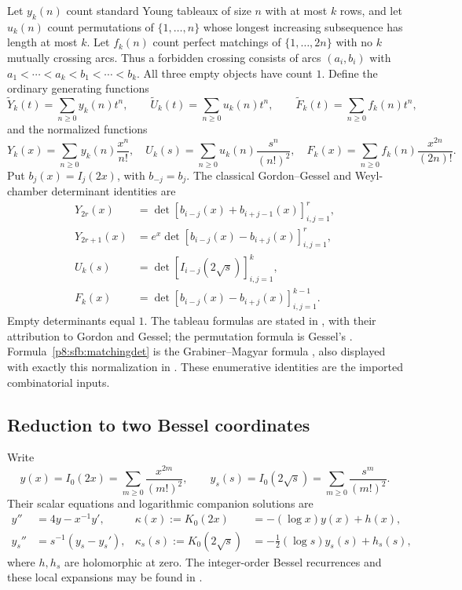 \documentclass[11pt,a4paper]{article}
\theoremstyle{definition}
\theoremstyle{remark}
\numberwithin{equation}{section}
\begin{document}
Let $y_k(n)$ count standard Young tableaux of size $n$ with at most
$k$ rows, and let $u_k(n)$ count permutations of $\{1,\ldots,n\}$
whose longest increasing subsequence has length at most $k$.
Let $f_k(n)$ count perfect matchings of $\{1,\ldots,2n\}$ with
no $k$ mutually crossing arcs.  Thus a forbidden crossing consists
of arcs $(a_i,b_i)$ with
$a_1<\cdots<a_k<b_1<\cdots<b_k$.
All three empty objects have count $1$.
Define the ordinary generating functions
\[
 \widetilde Y_k(t)=\sum_{n\ge0}y_k(n)t^n,\qquad
 \widetilde U_k(t)=\sum_{n\ge0}u_k(n)t^n,\qquad
 \widetilde F_k(t)=\sum_{n\ge0}f_k(n)t^n,
\]
and the normalized functions
\[
 Y_k(x)=\sum_{n\ge0}y_k(n)\frac{x^n}{n!},\quad
 U_k(s)=\sum_{n\ge0}u_k(n)\frac{s^n}{(n!)^2},\quad
 F_k(x)=\sum_{n\ge0}f_k(n)\frac{x^{2n}}{(2n)!}.
\]
Put $b_j(x)=I_j(2x)$, with $b_{-j}=b_j$.  The classical
Gordon--Gessel and Weyl-chamber determinant identities are
\begin{align}
 Y_{2r}(x)&=\det[b_{i-j}(x)+b_{i+j-1}(x)]_{i,j=1}^{r},
       \label{p8:sfb:tableaueven}\\
 Y_{2r+1}(x)&=e^x\det[b_{i-j}(x)-b_{i+j}(x)]_{i,j=1}^{r},
       \label{p8:sfb:tableauodd}\\
 U_k(s)&=\det[I_{i-j}(2\sqrt{s})]_{i,j=1}^{k},
       \label{p8:sfb:permdet}\\
 F_k(x)&=\det[b_{i-j}(x)-b_{i+j}(x)]_{i,j=1}^{k-1}.
       \label{p8:sfb:matchingdet}
\end{align}
Empty determinants equal $1$.  The tableau formulas are stated
in \cite[\S1.2, equations (6)--(7)]{p8:SFB_Mishna}, with their
attribution to Gordon and Gessel; the permutation formula is
Gessel's \cite{p8:SFB_Gessel}.  Formula~\eqref{p8:sfb:matchingdet}
is the Grabiner--Magyar formula \cite{p8:SFB_GrabinerMagyar},
also displayed with exactly this normalization in
\cite[equation (1.4)]{p8:SFB_JinReidysWang}.
These enumerative identities are the imported combinatorial inputs.

\subsection{Reduction to two Bessel coordinates}

Write
\[
 y(x)=I_0(2x)=\sum_{m\ge0}\frac{x^{2m}}{(m!)^2},\qquad
 y_s(s)=I_0(2\sqrt{s})=\sum_{m\ge0}\frac{s^m}{(m!)^2}.
\]
Their scalar equations and logarithmic companion solutions are
\begin{align}
 y''&=4y-x^{-1}y',&
 \kappa(x):=K_0(2x)&=-(\log x)y(x)+h(x),\label{p8:sfb:besselx}\\
 y_s''&=s^{-1}(y_s-y_s'),&
 \kappa_s(s):=K_0(2\sqrt{s})
       &=-\tfrac12(\log s)y_s(s)+h_s(s),\label{p8:sfb:bessels}
\end{align}
where $h,h_s$ are holomorphic at zero.  The integer-order Bessel
recurrences and these local expansions may be found in
\cite[\S\S10.29, 10.31]{p6:DLMF}.
\end{document}
